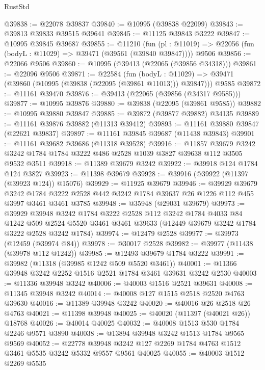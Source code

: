 \begin{lexlean}{RustStd}
\begin{coremodule}
@39838 := @22078 @39837
@39840 := @10995 (@39838 @22099)
@39843 := @39813 @39833 @39515 @39641
@39845 := @11125 @39843 @3222
@39847 := @10995 @39845 @39687
@39855 := @11210
    (fun (pl : @11019) => @22056 (fun (bodyL : @11029) => @39471 (@39561 (@39840 @39847))))
    @9506
@39856 := @22066 @9506
@39860 := @10995 (@39413 (@22065 (@39856 @34318)))
@39861 := @22096 @9506
@39871 := @22584
    (fun (bodyL : @11029) => @39471 (@39860 (@10995 (@39838 (@22095 (@39861 @11013))) @39847)))
    @9585
@39872 := @11161 @39470
@39876 := @39413 (@22065 (@39856 (@34317 @9585)))
@39877 := @10995 @39876
@39880 := @39838 (@22095 (@39861 @9585))
@39882 := @10995 @39880 @39847
@39885 := @39872 (@39877 @39882) @34135
@39889 := @11161 @39876 @39882 (@11313 @39412)
@39893 := @11161 @39880 @39847 (@22621 @39837)
@39897 := @11161 @39845 @39687 (@11438 @39843)
@39901 := @11161 @39682 @39686 (@11318 @39528)
@39916 := @11857
    @39679
    @3242
    @3242
    @1784
    @1784
    @3222
    @486
    @2528
    @1039
    @3827
    @39638
    @112
    @3505
    @9532
    @3511
@39918 := @11389 @39679 @3242
@39922 := @39918 @124 @1784 @124 @3827
@39923 := @11398 @39679
@39928 := @39916 (@39922 (@11397 (@39923 @124)) @15076)
@39929 := @11925 @39679
@39946 := @39929
    @39679
    @3242
    @1784
    @3222
    @2528
    @442
    @3242
    @1784
    @39637
    @26
    @1226
    @112
    @455
    @3997
    @3461
    @3461
    @3785
@39948 := @35948 (@29031 @39679)
@39973 := @39929
    @39948
    @3242
    @1784
    @3222
    @2528
    @112
    @3242
    @1784
    @4033
    @84
    @1242
    @509
    @2524
    @5520
    @3461
    @3461
    @39633
    (@12449 @39679 @3242 @1784 @3222 @2528 @3242 @1784)
@39974 := @12479 @2528
@39977 := @39973 (@12459 (@39974 @84))
@39978 := @30017 @2528
@39982 := @39977 (@11438 (@39978 @112 @1242))
@39985 := @12493 @39679 @1784 @3222
@39991 := @39982 (@11318 (@39985 @1242 @509 @5520 @3461))
@40001 := @11366 @39948 @3242 @2252 @1516 @2521 @1784 @3461 @39631 @3242 @2530
@40003 := @11336 @39948 @3242
@40006 := @40003 @1516 @2521 @39631
@40008 := @11345 @39948 @3242
@40014 := @40008 @127 @1515 @2518 @2520 @4763 @39630
@40016 := @11389 @39948 @3242
@40020 := @40016 @26 @2518 @26 @4763
@40021 := @11398 @39948
@40025 := @40020 (@11397 (@40021 @26)) @18768
@40026 := @40014 @40025
@40032 := @40008 @1513 @530 @1784 @2246 @9571 @3890
@40038 := @13894 @39948 @3242 @1513 @1784 @9565 @9569
@40052 := @22778
    @39948
    @3242
    @127
    @2269
    @1784
    @4763
    @1512
    @3461
    @5535
    @3242
    @5332
    @9557
    @9561
    @40025
@40055 := @40003 @1512 @2269 @5535

\end{coremodule}
\end{lexlean}
